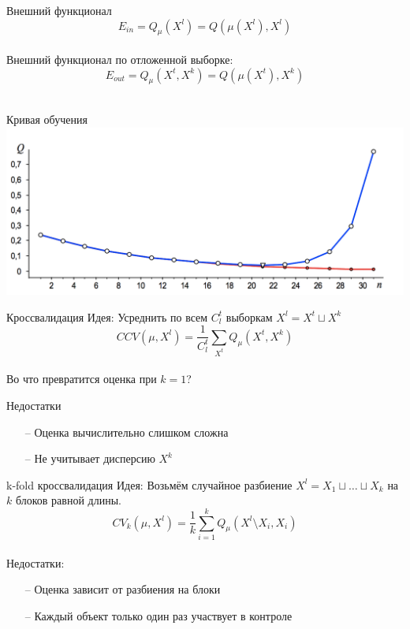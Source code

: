 \documentclass[10pt]{beamer}
\begin{document}
\begin{frame}{Внешний функционал}  
  $$E_{in} = Q_{\mu}(X^l) = Q(\mu(X^l), X^l)$$\\
  \bigbreak
  Внешний функционал по отложенной выборке:\\
  $$E_{out} = Q_{\mu}(X^t, X^k) = Q(\mu(X^t), X^k)$$\\
  \bigbreak
\end{frame}

{
\begin{frame}{Кривая обучения}  
  \includegraphics[width=\textwidth]{images/learning_curve}
\end{frame}
}

{
\begin{frame}{Кроссвалидация}  
  \alert{Идея}: Усреднить по всем $C_l^t$ выборкам $X^l = X^t \sqcup X^k$\\
  $$CCV(\mu, X^l) = \frac{1}{C_l^t} \sum\limits_{X^t} Q_{\mu}(X^t, X^k)$$\\
  \bigbreak
  \pause
  Во что превратится оценка при $k=1$?
\end{frame}
}

\begin{frame}{Недостатки}  
  \begin{enumerate}
    \item[--] Оценка вычислительно слишком сложна
    \item[--] Не учитывает дисперсию $X^k$
  \end{enumerate}
\end{frame}

\begin{frame}{k-fold кроссвалидация}  
  \alert{Идея}: Возьмём случайное разбиение $X^l = X_1 \sqcup \dots \sqcup X_k$ на $k$ блоков равной длины.\\
  $$CV_k(\mu, X^l) = \frac{1}{k} \sum\limits_{i=1}^{k} Q_{\mu}(X^l \setminus X_i, X_i)$$\\
  \bigbreak
  \pause
  Недостатки:  
  \begin{enumerate}
    \item[--] Оценка зависит от разбиения на блоки
    \item[--] Каждый объект только один раз участвует в контроле    
  \end{enumerate}
\end{frame}
\end{document}
